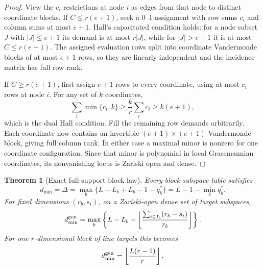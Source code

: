 \documentclass[11pt]{article}
\newtheorem{theorem}{Theorem}[section]
\theoremstyle{definition}\newtheorem{definition}[theorem]{Definition}\newtheorem{example}[theorem]{Example}
\theoremstyle{remark}\newtheorem{remark}[theorem]{Remark}\newtheorem{limitation}[theorem]{Limitation}
\begin{document}
\begin{proof}
View the $c_i$ restrictions at node $i$ as edges from that node to distinct
coordinate blocks.  If $C\le r(e+1)$, seek a $0$--$1$ assignment with row
sums $c_i$ and column sums at most $e+1$.  Hall's capacitated condition holds:
for a node subset $J$ with $|J|\le e+1$ its demand is at most $r|J|$, while
for $|J|>e+1$ it is at most $C\le r(e+1)$.  The assigned evaluation rows split
into coordinate Vandermonde blocks of at most $e+1$ rows, so they are linearly
independent and the incidence matrix has full row rank.

If $C\ge r(e+1)$, first assign $e+1$ rows to every coordinate, using at most
$c_i$ rows at node $i$.  For any set of $k$ coordinates,
\[
 \sum_i\min\{c_i,k\}\ge \frac{k}{r}\sum_i c_i\ge k(e+1),
\]
which is the dual Hall condition.  Fill the remaining row demands arbitrarily.
Each coordinate now contains an invertible $(e+1)\times(e+1)$ Vandermonde
block, giving full column rank.  In either case a maximal minor is nonzero for
one coordinate configuration.  Since that minor is polynomial in local
Grassmannian coordinates, its nonvanishing locus is Zariski open and dense.
\end{proof}

\begin{theorem}[Exact full-support block law]\label{thm:block}
Every block-subspace table satisfies
\begin{equation}\label{eq:block}
 \boxed{\quad d_{\min}=\Delta
 =\max_b\{L-L_b+L_b-1-q_b^*\}
 =L-1-\min_b q_b^*.\quad}
\end{equation}
For fixed dimensions $(r_b,s_i)$, on a Zariski-open dense set of target
subspaces,
\begin{equation}\label{eq:block-generic}
 d_{\min}^{\rm gen}
 =\max_b\left\{L-L_b+\left\lfloor
             \frac{\sum_{i\in I_b}(r_b-s_i)}{r_b}\right\rfloor\right\}.
\end{equation}
For one $r$-dimensional block of line targets this becomes
\begin{equation}\label{eq:global-generic}
                     d_{\min}^{\rm gen}
                     =\left\lfloor\frac{L(r-1)}r\right\rfloor.
\end{equation}
\end{theorem}
\end{document}
